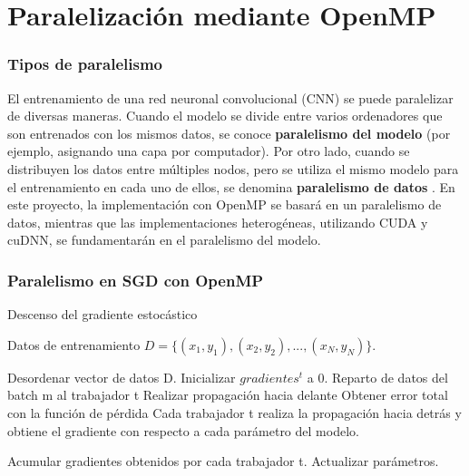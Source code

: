 \section{Paralelización mediante OpenMP}

\subsubsection{Tipos de paralelismo}

El entrenamiento de una red neuronal convolucional (CNN) se puede paralelizar de diversas maneras. Cuando el modelo se divide entre varios ordenadores que son entrenados con los mismos datos, se conoce \textbf{paralelismo del modelo} \cite{data_model_parallelism} (por ejemplo, asignando una capa por computador). Por otro lado, cuando se distribuyen los datos entre múltiples nodos, pero se utiliza el mismo modelo para el entrenamiento en cada uno de ellos, se denomina \textbf{paralelismo de datos} \cite{model_parallelism}. En este proyecto, la implementación con OpenMP se basará en un paralelismo de datos, mientras que las implementaciones heterogéneas, utilizando CUDA y cuDNN, se fundamentarán en el paralelismo del modelo. \\

\subsubsection{Paralelismo en SGD con OpenMP}
\begin{algorithm}[H]
	\caption{Descenso del gradiente estocástico} 
	\begin{algorithmic}
		\State Datos de entrenamiento $D=\{(x_1, y_1), (x_2, y_2), ..., (x_N, y_N)\}$.
		
			\State Desordenar vector de datos D.
					\State Inicializar $gradientes^t$ a 0.
					\State Reparto de datos del batch m al trabajador t
					\State Realizar propagación hacia delante
					\State Obtener error total con la función de pérdida
					\State Cada trabajador t realiza la propagación hacia 
					\State detrás y obtiene el gradiente con respecto a 
					\State cada parámetro del modelo.
					
					\State Acumular gradientes obtenidos por cada trabajador t.
					\State Actualizar parámetros.
					
				\EndFor
			\EndFor
		\EndFor
	\end{algorithmic}
\end{algorithm}

